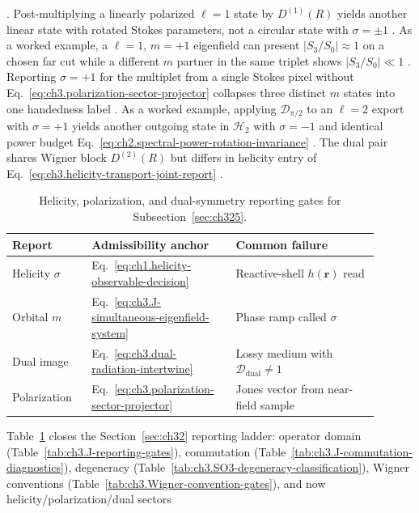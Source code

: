 \cite{jackson1999}. Post-multiplying a linearly polarized \(\ell=1\) state by \(D^{(1)}(R)\) yields
another linear state with rotated Stokes parameters, not a circular state with \(\sigma=\pm1\)
\cite{stratton1941}.
As a worked example, a \(\ell=1\), \(m=+1\) eigenfield can present \(|S_3/S_0|\approx1\) on a chosen far cut while a different
\(m\) partner in the same triplet shows \(|S_3/S_0|\ll1\) \cite{jackson1999}. Reporting
\(\sigma=+1\) for the multiplet from a single Stokes pixel without
Eq.~\eqref{eq:ch3.polarization-sector-projector} collapses three distinct \(m\) states into one handedness
label \cite{stratton1941}.
As a worked example, applying \(\mathcal{D}_{\pi/2}\) to an \(\ell=2\) export with \(\sigma=+1\) yields another outgoing state in
\(\mathcal{H}_{2}\) with \(\sigma=-1\) and identical power budget
Eq.~\eqref{eq:ch2.spectral-power-rotation-invariance} \cite{stratton1941}. The dual pair shares
Wigner block \(D^{(2)}(R)\) but differs in helicity entry of
Eq.~\eqref{eq:ch3.helicity-transport-joint-report} \cite{jackson1999}.
\begin{table}[t]
\centering
\caption{Helicity, polarization, and dual-symmetry reporting gates for Subsection~\ref{sec:ch325}.}
\label{tab:ch3.helicity-polarization-gates}
\small
\begin{tabular}{@{}p{0.20\linewidth}p{0.34\linewidth}p{0.36\linewidth}@{}}
\toprule
Report & Admissibility anchor & Common failure \\
\midrule
Helicity \(\sigma\) &
Eq.~\eqref{eq:ch1.helicity-observable-decision} &
Reactive-shell \(h(\mathbf{r})\) read \\
\addlinespace
Orbital \(m\) &
Eq.~\eqref{eq:ch3.J-simultaneous-eigenfield-system} &
Phase ramp called \(\sigma\) \\
\addlinespace
Dual image &
Eq.~\eqref{eq:ch3.dual-radiation-intertwine} &
Lossy medium with \(\mathcal{D}_{\mathrm{dual}}\neq1\) \\
\addlinespace
Polarization &
Eq.~\eqref{eq:ch3.polarization-sector-projector} &
Jones vector from near-field sample \\
\bottomrule
\end{tabular}
\end{table}
Table~\ref{tab:ch3.helicity-polarization-gates} closes the Section~\ref{sec:ch32} reporting ladder: operator
domain (Table~\ref{tab:ch3.J-reporting-gates}), commutation (Table~\ref{tab:ch3.J-commutation-diagnostics}),
degeneracy (Table~\ref{tab:ch3.SO3-degeneracy-classification}), Wigner conventions
(Table~\ref{tab:ch3.Wigner-convention-gates}), and now helicity/polarization/dual sectors
